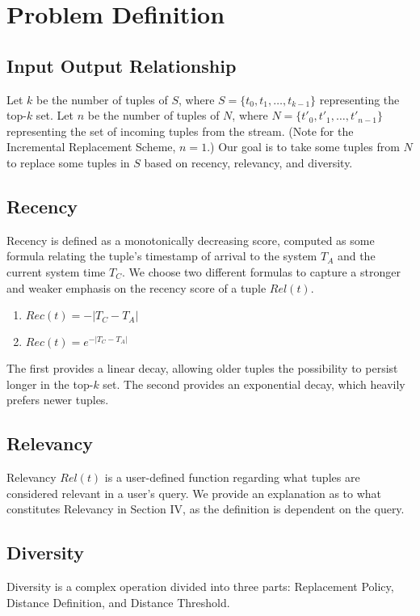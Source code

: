 \section{Problem Definition}
\subsection{Input Output Relationship}
	Let $k$ be the number of tuples of $S$, where $S = \{t_0, t_1, \dots, t_{k-1}\}$ representing the top-$k$ set.  Let $n$ be the number of tuples of $N$, where $N = \{t'_0, t'_1, \dots, t'_{n-1}\}$ representing the set of incoming tuples from the stream.  (Note for the Incremental Replacement Scheme, $n = 1$.)  Our goal is to take some tuples from $N$ to replace some tuples in $S$ based on recency, relevancy, and diversity.

\subsection{Recency}
	Recency is defined as a monotonically decreasing score, computed as some formula relating the tuple's timestamp of arrival to the system $T_A$ and the current system time $T_C$.  We choose two different formulas to capture a stronger and weaker emphasis on the recency score of a tuple $Rel(t)$.
	\begin{enumerate}
		\item $Rec(t) = -|T_C - T_A|$
		\item $Rec(t) = e^{-|T_C - T_A|}$
	\end{enumerate}
	The first provides a linear decay, allowing older tuples the possibility to persist longer in the top-$k$ set.  The second provides an exponential decay, which heavily prefers newer tuples.

\subsection{Relevancy}
	Relevancy $Rel(t)$ is a user-defined function regarding what tuples are considered relevant in a user's query.  We provide an explanation as to what constitutes Relevancy in Section IV, as the definition is dependent on the query.

\subsection{Diversity}
	Diversity is a complex operation divided into three parts: Replacement Policy, Distance Definition, and Distance Threshold.  

